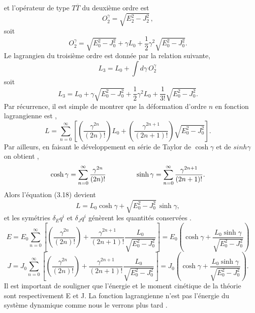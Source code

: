 \documentclass[12pt,a4paper, openany]{report}
\begin{document}
	et l'opérateur de type $T{\overline{T}}$ du deuxième ordre est 
	\begin{equation}
		O^{\gamma}_2=\sqrt{E^{2}_2-J^{2}_2} \,,
	\end{equation}
	soit 
	\begin{equation}
		O^{\gamma}_2=\sqrt{E^{2}_0-J^{2}_0}+{\gamma}L_0+\frac{1}{2}{\gamma}^{2}\sqrt{E^{2}_0-J^{2}_0} .
	\end{equation}
	Le lagrangien du troisième ordre est donnée par la relation suivante,
	\begin{equation}
		L_3=L_0+\int  d{\gamma}\,O^{\gamma}_{2}\,	
	\end{equation}
	soit 
	\begin{equation}
		L_3=L_0+\gamma\sqrt{E^{2}_0-J^{2}_0}+\frac{1}{2}\gamma^2L_0+\frac{1}{3!}\sqrt{E^2_0-J_0^2} .
	\end{equation}
	Par récurrence, il est simple de montrer que la déformation d'ordre $n$ en fonction lagrangienne est ,
	\begin{equation}
		L=\sum_{n=0}^{\infty}\left[\left(\frac{\gamma^{2n}}{(2n)!}\right)L_0+\left(\frac{\gamma^{2n+1
		}}{(2n+1)!}\right)\sqrt{E^2_0-J_0^2}\right] .
	\end{equation}
	Par ailleurs, en faisant le développement en série de Taylor  de $\cosh{\gamma}$ et de $sinh{\gamma}$ on obtient ,
	\begin{equation}
		\cosh{\gamma}=\sum_{n=0}^{\infty}\frac{\gamma^{2n}}{(2n)!} \hspace{1.5cm} \sinh{\gamma}=\sum_{n=0}^{\infty} \frac{\gamma^{2n+1
		}}{(2n+1)!} .
	\end{equation}
	Alors l'équation (3.18) devient 
	\begin{equation}
		L=L_0\cosh{\gamma}+\sqrt{E^2_0-J_0^2} \,\sinh{\gamma} ,
	\end{equation}
	et les symétries $ \delta_{E}q^{i}$ et $\delta_{J}q^i$ génèrent les quantités conservées .
	\begin{equation}
		 E=E_0\sum_{n=0}^{\infty}\left[\left(\frac{\gamma^{2n}}{(2n)!}\right)+\frac{
			\gamma^{2n+1}}{(2n+1)!}\frac{L_0}{\sqrt{E^2_0-J_0^2}}\right]=E_0\left(\cosh{\gamma}+\frac{L_0\sinh{\gamma}}{\sqrt{E^2_0-J_0^2}}\right)
	\end{equation}
	\begin{equation}
			J=J_0\sum_{n=0}^{\infty}\left[\left(\frac{\gamma^{2n}}{(2n)!}\right)+\frac{
			\gamma^{2n+1}}{(2n+1)!}\frac{L_0}{\sqrt{E^2_0-J_0^2}}\right]=J_0\left(\cosh{\gamma}+\frac{L_0\sinh{\gamma}}{\sqrt{E^2_0-J_0^2}}\right) .
	\end{equation}
	Il est important de souligner que l'énergie et le moment cinétique de la théorie sont respectivement E et J. La fonction lagrangienne n'est pas l'énergie du système dynamique comme nous le verrons plus tard .\\
	
\end{document}
